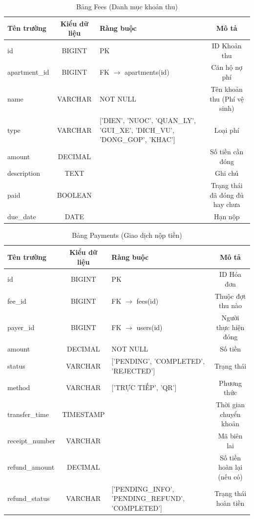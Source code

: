 \documentclass[12pt,a4paper]{article}
\begin{document}
\begin{table}[H]
    \centering
    \caption{Bảng Fees (Danh mục khoản thu)}
    \begin{tabularx}{\textwidth}{|L{2.5cm}|c|X|c|}
    \hline
    \textbf{Tên trường} & \textbf{Kiểu dữ liệu} & \textbf{Ràng buộc} & \textbf{Mô tả} \\
    \hline
    id & BIGINT & PK & ID Khoản thu \\
    \hline
    apartment\_id & BIGINT & FK $\rightarrow$ apartments(id) & Căn hộ nợ phí \\
    \hline
    name & VARCHAR & NOT NULL & Tên khoản thu (Phí vệ sinh) \\
    \hline
    type & VARCHAR & ['DIEN', 'NUOC', 'QUAN\_LY', 'GUI\_XE', 'DICH\_VU', 'DONG\_GOP', 'KHAC'] & Loại phí \\
    \hline
    amount & DECIMAL & & Số tiền cần đóng \\
    \hline
    description & TEXT & & Ghi chú \\
    \hline
    paid & BOOLEAN & & Trạng thái đã đóng đủ hay chưa \\
    \hline
    due\_date & DATE & & Hạn nộp \\
    \hline
    \end{tabularx}
\end{table}

\begin{table}[H]
    \centering
    \caption{Bảng Payments (Giao dịch nộp tiền)}
    \begin{tabularx}{\textwidth}{|L{2.5cm}|c|X|c|}
    \hline
    \textbf{Tên trường} & \textbf{Kiểu dữ liệu} & \textbf{Ràng buộc} & \textbf{Mô tả} \\
    \hline
    id & BIGINT & PK & ID Hóa đơn \\
    \hline
    fee\_id & BIGINT & FK $\rightarrow$ fees(id) & Thuộc đợt thu nào \\
    \hline
    payer\_id & BIGINT & FK $\rightarrow$ users(id) & Người thực hiện đóng \\
    \hline
    amount & DECIMAL & NOT NULL & Số tiền \\
    \hline
    status & VARCHAR & ['PENDING', 'COMPLETED', 'REJECTED'] & Trạng thái \\
    \hline
    method & VARCHAR & ['TRỰC TIẾP', 'QR'] & Phương thức \\
    \hline
    transfer\_time & TIMESTAMP & & Thời gian chuyển khoản \\
    \hline
    receipt\_number & VARCHAR & & Mã biên lai \\
    \hline
    refund\_amount & DECIMAL & & Số tiền hoàn lại (nếu có) \\
    \hline
    refund\_status & VARCHAR & ['PENDING\_INFO', 'PENDING\_REFUND', 'COMPLETED'] & Trạng thái hoàn tiền \\
    \hline
    \end{tabularx}
\end{table}
\end{document}
